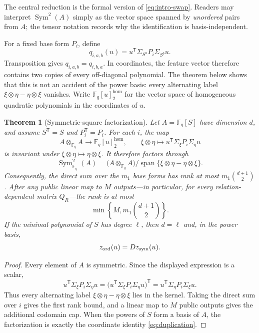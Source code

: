 \documentclass[11pt]{article}
\newtheorem{theorem}{Theorem}
\newcommand{\F}{\mathbb F}
\newcommand{\Sym}{\operatorname{Sym}}
\newcommand{\Span}{\operatorname{span}}
\newcommand{\transpose}{\mathsf T}
\begin{document}
The central reduction is the formal version of
\eqref{eq:intro-swap}.  Readers may interpret $\Sym^2(A)$ simply as the vector
space spanned by \emph{unordered} pairs from $A$; the tensor notation records
why the identification is basis-independent.

For a fixed base form $P_i$, define
\[
  q_{i,a,b}(u)=u^\transpose\Sigma_{S^a}P_i\Sigma_{S^b}u.
\]
Transposition gives $q_{i,a,b}=q_{i,b,a}$.  In coordinates, the feature vector
therefore contains two copies of every off-diagonal polynomial.  The theorem
below shows that this is not an accident of the power basis: every alternating
label $\xi\otimes\eta-\eta\otimes\xi$ vanishes.  Write
$\F_q[u]^{\mathrm{hom}}_2$ for the vector space of homogeneous quadratic
polynomials in the coordinates of $u$.

\begin{theorem}[Symmetric-square factorization]\label{thm:symmetric-square}
Let $A=\F_q[S]$ have dimension $d$, and assume $S^\transpose=S$ and
$P_i^\transpose=P_i$.  For each $i$, the map
\[
 A\otimes_{\F_q}A\longrightarrow \F_q[u]^{\mathrm{hom}}_2,
 \qquad
 \xi\otimes\eta\longmapsto
 u^\transpose\Sigma_\xi P_i\Sigma_\eta u
\]
is invariant under $\xi\otimes\eta\mapsto\eta\otimes\xi$.  It therefore
factors through
\[
 \Sym^2_{\F_q}(A)
 =\bigl(A\otimes_{\F_q}A\bigr)
   \big/\Span\{\xi\otimes\eta-\eta\otimes\xi\}.
\]
Consequently, the direct sum over the $m_1$ base forms has rank at most
$m_1\binom{d+1}{2}$.  After any public linear map to $M$ outputs---in
particular, for every relation-dependent matrix $Q_R$---the rank is at most
\begin{equation}\label{eq:symmetry-rank}
 \min\left\{M,m_1\binom{d+1}{2}\right\}.
\end{equation}
If the minimal polynomial of $S$ has degree $\ell$, then $d=\ell$ and, in the
power basis,
\begin{equation}\label{eq:duplication}
 z_{\rm ord}(u)=Dz_{\rm sym}(u).
\end{equation}
\end{theorem}

\begin{proof}
Every element of $A$ is symmetric.  Since the displayed expression is a
scalar,
\[
 u^\transpose\Sigma_\xi P_i\Sigma_\eta u
 =\bigl(u^\transpose\Sigma_\xi P_i\Sigma_\eta u\bigr)^\transpose
 =u^\transpose\Sigma_\eta P_i\Sigma_\xi u.
\]
Thus every alternating label $\xi\otimes\eta-\eta\otimes\xi$ lies in the
kernel.  Taking the direct sum over $i$ gives the first rank bound, and a
linear map to $M$ public outputs gives the additional codomain cap.  When the
powers of $S$ form a basis of $A$, the factorization is exactly the coordinate
identity \eqref{eq:duplication}.
\end{proof}
\end{document}
